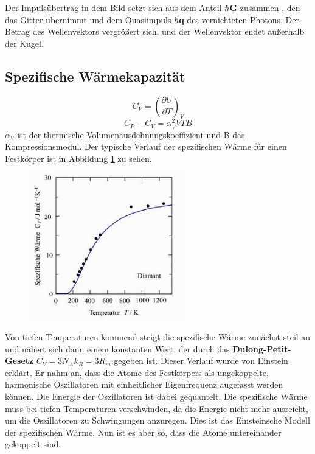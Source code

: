 \documentclass[11pt]{article}
\begin{document}
Der Impulsübertrag in dem Bild setzt sich aus dem Anteil $\hbar\bm{G}$ zusammen
, den das Gitter übernimmt und dem Quasiimpuls $\hbar\bm{q}$ des vernichteten
Photons. Der Betrag des Wellenvektors vergrößert sich, und der Wellenvektor
endet außerhalb der Kugel.
\subsection{Spezifische Wärmekapazität}
\begin{equation}
  C_V=\left(\frac{\partial U}{\partial T}\right)_V
\end{equation}
\begin{equation}
  C_P-C_V=\alpha^2_VVTB
\end{equation}
$\alpha_V$ ist der thermische Volumenausdehnungskoeffizient und B das
Kompressionsmodul. Der typische Verlauf der spezifischen Wärme für einen
Festkörper ist in Abbildung \ref{fig:spezifische} zu sehen.
\begin{figure}[h]
\includegraphics[width=0.6\textwidth]{spezifische}
\centering
\label{fig:spezifische}
\end{figure}

Von tiefen Temperaturen kommend steigt die spezifische Wärme zunächst steil an
und nähert sich dann einem konstanten Wert, der durch das \textbf{Dulong-Petit-
Gesetz} $C_V=3N_Ak_B=3R_m$ gegeben ist. Dieser Verlauf wurde von Einstein
erklärt. Er nahm an, dass die Atome des Festkörpers als ungekoppelte,
harmonische Oszillatoren mit einheitlicher Eigenfrequenz augefasst werden
können. Die Energie der Oszillatoren ist dabei gequantelt. Die spezifische
Wärme muss bei tiefen Temperaturen verschwinden, da die Energie nicht mehr
ausreicht, um die Oszillatoren zu Schwingungen anzuregen. Dies ist das
Einsteinsche Modell der spezifischen Wärme. Nun ist es aber so, dass die Atome
untereinander gekoppelt sind.
\end{document}

